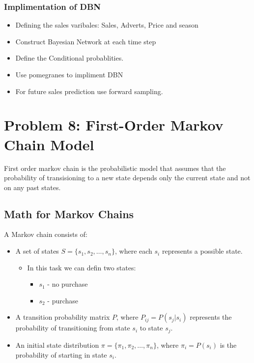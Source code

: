 \documentclass{article}
\begin{document}
\subsubsection*{Implimentation of DBN}
\begin{itemize}
    \item Defining the sales varibales: Sales, Adverts, Price and season
    \item Construct Bayesian Network at each time step
    \item Define the Conditional probablities.
    \item Use pomegranes to impliment DBN
    \item For future sales prediction use forward sampling.
\end{itemize}
\clearpage


\section*{Problem 8: First-Order Markov Chain Model}
First order markov chain is the probabilistic model that assumes that the probability of transisioning to a new state depends only
the current state and not on any past states. 

\subsection*{Math for Markov Chains}
A Markov chain consists of:
\begin{itemize}
    \item A set of states \(S = \{s_1, s_2, \ldots, s_n\}\), where each \(s_i\) represents a possible state.
    \begin{itemize}
        \item In this task we can defin two states:
        \begin{itemize}
            \item \(s_1\) - no purchase
            \item \(s_2\) - purchase
        \end{itemize}
    \end{itemize}
    \item A transition probability matrix \(P\), where \(P_{ij} = P(s_j | s_i)\) represents the probability of transitioning from state \(s_i\) to state \(s_j\).
    \item An initial state distribution \(\pi = \{\pi_1, \pi_2, \ldots, \pi_n\}\), where \(\pi_i = P(s_i)\) is the probability of starting in state \(s_i\).
\end{itemize}
\end{document}

